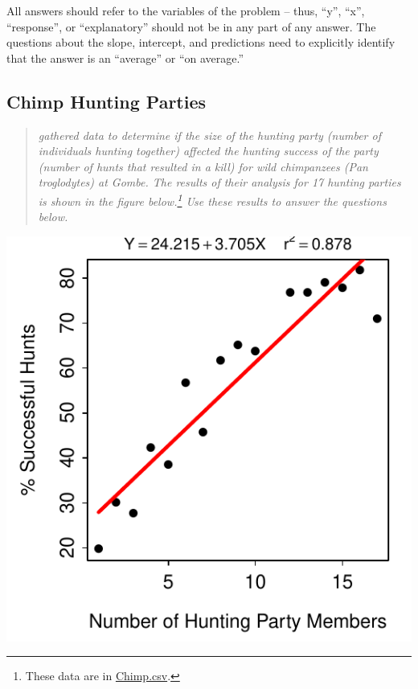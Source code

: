 \documentclass[10pt,openany]{book}\usepackage[]{graphicx}\usepackage[]{color}
\newenvironment{knitrout}{}{} %
\begin{document}
All answers should refer to the variables of the problem -- thus, ``y'', ``x'', ``response'', or ``explanatory'' should not be in any part of any answer.  The questions about the slope, intercept, and predictions need to explicitly identify that the answer is an ``average'' or ``on average.''

\subsection*{Chimp Hunting Parties}
\begin{quote}
\textit{\cite{Stanford1996} gathered data to determine if the size of the hunting party (number of individuals hunting together) affected the hunting success of the party (number of hunts that resulted in a kill) for wild chimpanzees (Pan troglodytes) at Gombe.  The results of their analysis for 17 hunting parties is shown in the figure below.\footnote{These data are in \href{https://raw.githubusercontent.com/droglenc/NCData/master/Chimp.csv}{Chimp.csv}.}  Use these results to answer the questions below.}
\end{quote}

\begin{knitrout}
\color{fgcolor}

{\centering \includegraphics[width=.4\linewidth]{Figs/ChimpFLP-1} 

}



\end{knitrout}
\end{document}
